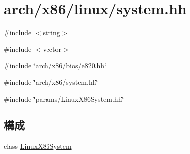 \hypertarget{arch_2x86_2linux_2system_8hh}{
\section{arch/x86/linux/system.hh}
\label{arch_2x86_2linux_2system_8hh}
}
{\ttfamily \#include $<$string$>$}\par
{\ttfamily \#include $<$vector$>$}\par
{\ttfamily \#include \char`\"{}arch/x86/bios/e820.hh\char`\"{}}\par
{\ttfamily \#include \char`\"{}arch/x86/system.hh\char`\"{}}\par
{\ttfamily \#include \char`\"{}params/LinuxX86System.hh\char`\"{}}\par
\subsection*{構成}
\begin{DoxyCompactItemize}
\item 
class \hyperlink{classLinuxX86System}{LinuxX86System}
\end{DoxyCompactItemize}
